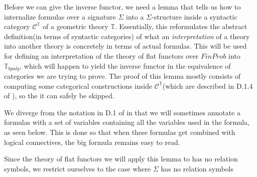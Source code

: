 \documentclass[a4paper]{amsproc}
\theoremstyle{plain}
\theoremstyle{definition}
\theoremstyle{remark}
\numberwithin{equation}{section}
\begin{document}
Before we can give the inverse functor, we need a lemma that tells us how to internalize formulas over a signature $\Sigma$ into a $\Sigma$-structure inside a syntactic category $\mathcal{C}^{\mathbb{T}}$ of a geometric theory $\mathbb{T}$. Essentially, this reformulates the abstract definition(in terms of syntactic categories) of what an \textit{interpretation} of a theory into another theory is concretely in terms of actual formulas. This will be used for defining an interpretation of the theory of flat functors over $FinProb$ into $\mathbb{T}_{bpalg}$, which will happen to yield the inverse functor in the equivalence of categories we are trying to prove. The proof of this lemma mostly consists of computing some categorical constructions inside $\mathcal{C}^{\mathbb{T}}$(which are described in D.1.4 of \cite{elephant}), so the it can safely be skipped.

We diverge from the notation in D.1 of \cite{elephant} in that we will sometimes annotate a formulas with a set of variables containing all the variables used in the formula, as seen below. This is done so that when these formulas get combined with logical connectives, the big formula remains easy to read.

Since the theory of flat functors we will apply this lemma to has no relation symbols, we restrict ourselves to the case where $\Sigma$ has no relation symbols
\end{document}
